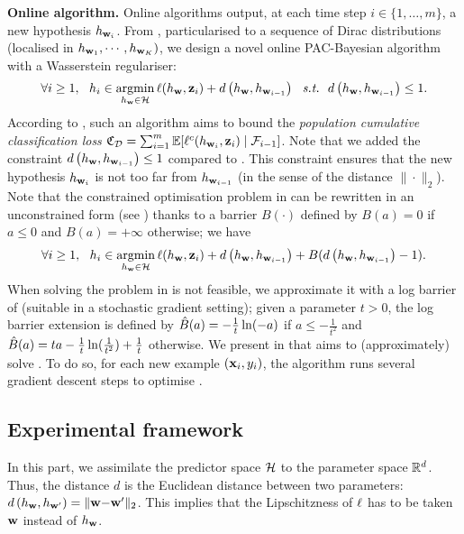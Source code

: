 \textbf{Online algorithm.} Online algorithms output, at each time step $i \in \{1, \dots, m\}$, a new hypothesis $h_{\mathbf{w}_i}$. 
From , particularised to a sequence of Dirac distributions (localised in $h_{\mathbf{w}_1},\cdots,h_{\mathbf{w}_K})$, we design a novel online PAC-Bayesian algorithm with a Wasserstein regulariser:
\begin{align}
    \label{eq:online-alg-exp}
    \forall i \geq 1,\ \ h_i\in \argmin_{h_{\wbf}\in \Hcal} \loss(h_{\wbf}, \z_i) +d\LP h_{\wbf},h_{\wbf_{i-1}}\RP \ \ \text{\emph{s.t.}} \ \ d\LP h_{\wbf},h_{\wbf_{i-1}}\RP \le 1.
\end{align}
According to , such an algorithm aims to bound the {\it population cumulative classification loss} $\mathfrak{C}_{\mathcal{D}} = \sum_{i=1}^{m}\operatorname*{\mathbb{E}}[\ell^{c}(h_{\mathbf{w}_i},\mathbf{z}_i) \mid \mathcal{F}_{i-1}]$.
Note that we added the constraint $d\left( h_{\mathbf{w}},h_{\mathbf{w}_{i-1}}\right) \le 1$ compared to . 
This constraint ensures that the new hypothesis $h_{\mathbf{w}_i}$ is not too far from $h_{\mathbf{w}_{i-1}}$ (in the sense of the distance $\|\cdot\|_2$).
Note that the constrained optimisation problem in  can be rewritten in an unconstrained form (see \cite{boyd2004convex}) thanks to a barrier $B(\cdot)$ defined by $B(a)=0$ if $a\le 0$ and $B(a)=+\infty$ otherwise; we have 
\begin{align}
    \label{eq:online-alg-exp-2}
    \forall i \geq 1,\ \ h_i\in \operatorname*{\mathrm{argmin}}_{h_{\mathbf{w}}\in \mathcal{H}} \ell(h_{\mathbf{w}}, \mathbf{z}_i) + d\left( h_{\mathbf{w}},h_{\mathbf{w}_{i-1}}\right)+ B(d\left( h_{\mathbf{w}},h_{\mathbf{w}_{i-1}}\right)-1).
\end{align}
When solving the problem in  is not feasible, we approximate it with a log barrier of \cite{kervadec2022constrained} (suitable in a stochastic gradient setting); given a parameter $t>0$, the log barrier extension is defined by $\hat{B}(a) = -\frac{1}{t}\ln(-a)$ if $a\le -\frac{1}{t^2}$ and $\hat{B}(a) = ta-\frac{1}{t}\ln(\frac{1}{t^2})+\frac{1}{t}$ otherwise.
We present in   that aims to (approximately) solve .
To do so, for each new example $(\mathbf{x}_i, y_i)$, the algorithm runs several gradient descent steps to optimise .


\subsection{Experimental framework}
\label{sec:exp-fram}

In this part, we assimilate the predictor space $\mathcal{H}$ to the parameter space $\mathbb{R}^d$.
Thus, the distance $d$ is the Euclidean distance between two parameters: $d\left( h_{\mathbf{w}},h_{\mathbf{w}'}\right) = \|\mathbf{w}{-}\mathbf{w}'\|_2$.
This implies that the Lipschitzness of $\ell$ has to be taken \wrt $\mathbf{w}$ instead of $h_{\mathbf{w}}$.

